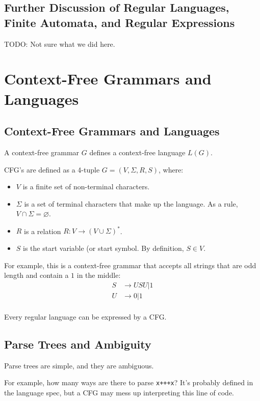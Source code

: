     \section{Further Discussion of Regular Languages, Finite Automata, and Regular Expressions}
        TODO: Not sure what we did here.

\chapter{Context-Free Grammars and Languages}
    \section{Context-Free Grammars and Languages}
        A context-free grammar $G$ defines a context-free language $L(G)$.

        CFG's are defined as a 4-tuple $G = (V, \Sigma, R, S)$, where:
        \begin{itemize}
            \item $V$ is a finite set of non-terminal characters.
            \item $\Sigma$ is a set of terminal characters that make up the
            language. As a rule, $V \cap \Sigma = \varnothing$.
            \item $R$ is a relation $R: V \to (V \cup \Sigma)^*$.
            \item $S$ is the start variable (or start symbol. By definition,
            $S \in V$.
        \end{itemize}

        For example, this is a context-free grammar that accepts all strings
        that are odd length and contain a $1$ in the middle:
        \begin{align*}
            S &\to USU | 1 \\
            U &\to 0 | 1 \\
        \end{align*}

        Every regular language can be expressed by a CFG.
    \section{Parse Trees and Ambiguity}
        Parse trees are simple, and they are ambiguous.

        For example, how many ways are there to parse \verb|x+++x|?
        It's probably defined in the language spec, but a CFG may mess up
        interpreting this line of code.


